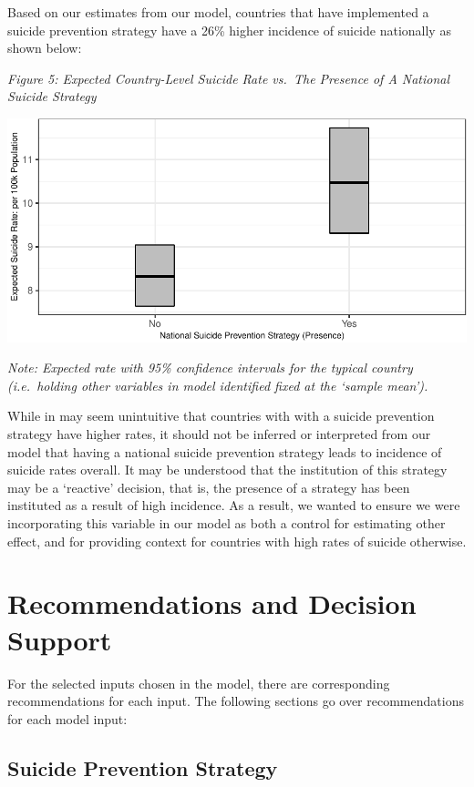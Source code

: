 \documentclass[]{article}
\begin{document}
Based on our estimates from our model, countries that have implemented a
suicide prevention strategy have a 26\% higher incidence of suicide
nationally as shown below:

\emph{Figure 5: Expected Country-Level Suicide Rate vs.~The Presence of
A National Suicide Strategy}

\begin{center}\includegraphics{Project_Report_files/figure-latex/sstrat_plot-1} \end{center}

\emph{Note: Expected rate with 95\% confidence intervals for the typical
country (i.e.~holding other variables in model identified fixed at the
`sample mean').}

While in may seem unintuitive that countries with with a suicide
prevention strategy have higher rates, it should not be inferred or
interpreted from our model that having a national suicide prevention
strategy leads to incidence of suicide rates overall. It may be
understood that the institution of this strategy may be a `reactive'
decision, that is, the presence of a strategy has been instituted as a
result of high incidence. As a result, we wanted to ensure we were
incorporating this variable in our model as both a control for
estimating other effect, and for providing context for countries with
high rates of suicide otherwise.

\section{Recommendations and Decision
Support}\label{recommendations-and-decision-support}

For the selected inputs chosen in the model, there are corresponding
recommendations for each input. The following sections go over
recommendations for each model input:

\subsection{Suicide Prevention
Strategy}\label{suicide-prevention-strategy}
\end{document}
